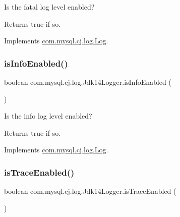 Is the \textquotesingle{}fatal\textquotesingle{} log level enabled?

\begin{DoxyReturn}{Returns}
true if so. 
\end{DoxyReturn}


Implements \mbox{\hyperlink{interfacecom_1_1mysql_1_1cj_1_1log_1_1_log_a61464d2603e609442da19c59c5c62f62}{com.\+mysql.\+cj.\+log.\+Log}}.

\mbox{\label{classcom_1_1mysql_1_1cj_1_1log_1_1_jdk14_logger_ac01fd7e8de57ff3e72b588c86dcf7e32}} 
\subsubsection{\texorpdfstring{is\+Info\+Enabled()}{isInfoEnabled()}}
{\footnotesize\ttfamily boolean com.\+mysql.\+cj.\+log.\+Jdk14\+Logger.\+is\+Info\+Enabled (\begin{DoxyParamCaption}{ }\end{DoxyParamCaption})}

Is the \textquotesingle{}info\textquotesingle{} log level enabled?

\begin{DoxyReturn}{Returns}
true if so. 
\end{DoxyReturn}


Implements \mbox{\hyperlink{interfacecom_1_1mysql_1_1cj_1_1log_1_1_log_aecb7f781b61b516d6bad9ada8e7dd3aa}{com.\+mysql.\+cj.\+log.\+Log}}.

\mbox{\label{classcom_1_1mysql_1_1cj_1_1log_1_1_jdk14_logger_abc67efb3ab231c21151dba192b032919}} 
\subsubsection{\texorpdfstring{is\+Trace\+Enabled()}{isTraceEnabled()}}
{\footnotesize\ttfamily boolean com.\+mysql.\+cj.\+log.\+Jdk14\+Logger.\+is\+Trace\+Enabled (\begin{DoxyParamCaption}{ }\end{DoxyParamCaption})}

